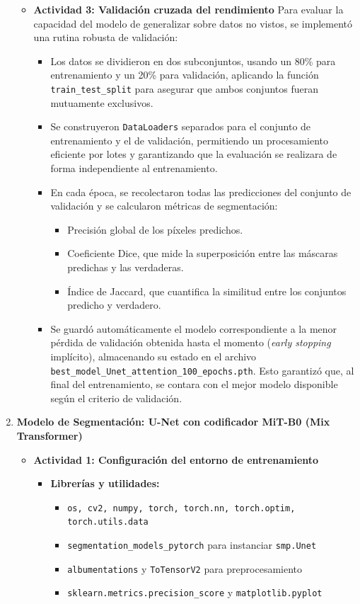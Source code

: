 \begin{enumerate}
\begin{itemize}
  \item\textbf{Actividad 3: Validación cruzada del rendimiento}
  Para evaluar la capacidad del modelo de generalizar sobre datos no vistos, se implementó una rutina robusta de validación:
\begin{itemize}
\item Los datos se dividieron en dos subconjuntos, usando un 80\% para entrenamiento y un 20\% para validación, aplicando la función \texttt{train\_test\_split} para asegurar que ambos conjuntos fueran mutuamente exclusivos.
\item Se construyeron \texttt{DataLoaders} separados para el conjunto de entrenamiento y el de validación, permitiendo un procesamiento eficiente por lotes y garantizando que la evaluación se realizara de forma independiente al entrenamiento.
\item En cada época, se recolectaron todas las predicciones del conjunto de validación y se calcularon métricas de segmentación:
  \begin{itemize}
  \item Precisión global de los píxeles predichos.
  \item Coeficiente Dice, que mide la superposición entre las máscaras predichas y las verdaderas.
  \item Índice de Jaccard, que cuantifica la similitud entre los conjuntos predicho y verdadero.
  \end{itemize}
\item Se guardó automáticamente el modelo correspondiente a la menor pérdida de validación obtenida hasta el momento (\emph{early stopping} implícito), almacenando su estado en el archivo \texttt{best\_model\_Unet\_attention\_100\_epochs.pth}. Esto garantizó que, al final del entrenamiento, se contara con el mejor modelo disponible según el criterio de validación.
\end{itemize}

  \end{itemize}

  \item \textbf{Modelo de Segmentación: U-Net con codificador MiT-B0 (Mix Transformer)}
  \begin{itemize}
  \item\textbf{Actividad 1: Configuración del entorno de entrenamiento}
  \begin{itemize}
    \item \textbf{Librerías y utilidades:}
      \begin{itemize}
        \item \texttt{os, cv2, numpy, torch, torch.nn, torch.optim, torch.utils.data}
        \item \texttt{segmentation\_models\_pytorch} para instanciar \texttt{smp.Unet}
        \item \texttt{albumentations} y \texttt{ToTensorV2} para preprocesamiento
        \item \texttt{sklearn.metrics.precision\_score} y \texttt{matplotlib.pyplot}
      \end{itemize}
  

\end{itemize}
\end{itemize}
\end{enumerate}
